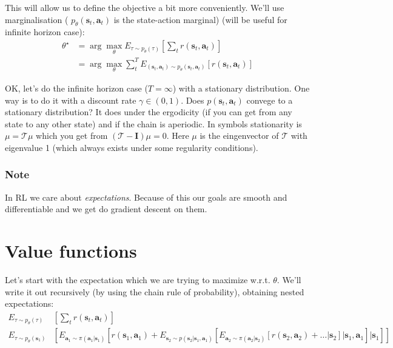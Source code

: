 \documentclass{report}
\newcommand{\argmax}{\arg\!\max}
\begin{document}
This will allow us to define the objective a bit more conveniently.
We'll use marginalisation ( $p_\theta (\bm{s}_t, \bm{a}_t)$ is the state-action marginal) (will be useful for infinite horizon case):
\begin{align}
		\theta^\star &= \argmax_{\theta} E_{\tau \sim p_\theta(\tau)} \left[ \sum_{t}^{} r(\bm{s}_t, \bm{a}_t) \right] \\
	 &= \argmax_{\theta} \sum_{t}^{T} E_{(\bm{s}_t, \bm{a}_t) \sim p_\theta(\bm{s}_t, \bm{a}_t)} \left[  r(\bm{s}_t, \bm{a}_t) \right]
\end{align}

OK, let's do the infinite horizon case ($T = \infty $) with a stationary distribution.
One way is to do it with a discount rate $\gamma \in (0,1)$.
Does $p(\bm{s}_t, \bm{a}_t)$ convege to a stationary distribution?
It does under the ergodicity (if you can get from any state to any other state) and if the chain is aperiodic.
In symbols stationarity is $\mu = \mathcal{T}\mu$ which you get from $(\mathcal{T} - \bm{I})\mu = 0$.
Here $\mu$ is the eingenvector of $\mathcal{T}$ with eigenvalue 1 (which always exists under some regularity conditions).
\subsubsection{Note} In RL we care about \textit{expectations}.
Because of this our goals are smooth and differentiable and we get do gradient descent on them.

\section{Value functions}
Let's start with the expectation which we are trying to maximize w.r.t. $\theta$.
We'll write it out recursively (by using the chain rule of probability), obtaining nested expectations:
\begin{align}
		E_{\tau \sim p_\theta(\tau)} & \left[ \sum_{t}^{} r(\bm{s}_t, \bm{a}_t) \right] \\
		E_{\tau \sim p_\theta(\bm{s}_1)} & \left[ E_{\bm{a}_1 \sim \pi(\bm{a}_1|\bm{s}_1)}
		\left[ r(\bm{s}_1, \bm{a}_1) + E_{\bm{s}_2  \sim p(\bm{s}_2 | \bm{s}_1, \bm{a}_1)} 
\left [				E_{\bm{a}_2 \sim \pi(\bm{a}_2|\bm{s}_2)}
				\left[ r(\bm{s}_2, \bm{a}_2) + \dots | \bm{s}_2 \right] | \bm{s}_1, \bm{a}_1
\right] | \bm{s}_1  \right] \right ]
\end{align}
\end{document}
